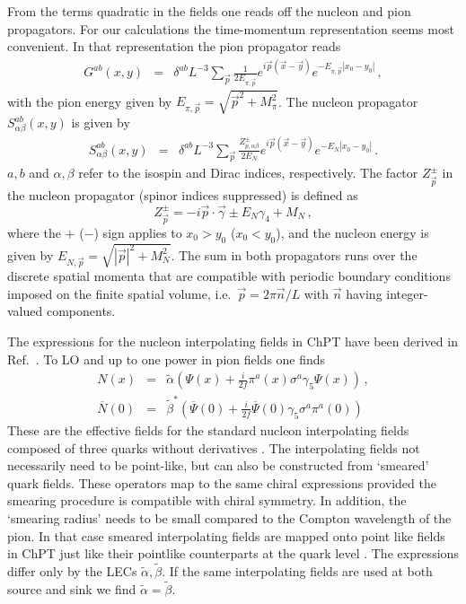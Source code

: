 \documentclass[11pt,prd,aps,showpacs,eqsecnum,floatfix,nofootinbib,preprint,tightenlines]{revtex4}
\newcommand{\Epip}{E_{\pi, \vec{p}}}
\begin{document}
\begin{appendix}
From the terms quadratic in the fields one reads off the nucleon and pion propagators. For our calculations the time-momentum representation seems most convenient. In that representation the pion propagator reads
\begin{eqnarray}
G^{ab}(x,y)& = &  \delta^{ab}L^{-3}\sum_{\vec{p}} \frac{1}{2 \Epip} e^{i\vec{p}(\vec{x}-\vec{y})} e^{-\Epip |x_0 - y_0|}\,,\label{scalprop}
\end{eqnarray}
with  the pion energy given by $\Epip =\sqrt{\vec{p}^2 +M_{\pi}^2}$. The nucleon propagator $S^{ab}_{\alpha\beta}(x,y)$ is given by
\begin{eqnarray}
S_{\alpha\beta}^{ab}(x,y)& = &  \delta^{ab} L^{-3}\sum_{\vec{p}} \frac{Z_{p,\alpha\beta}^{\pm}}{2E_N} e^{i\vec{p}(\vec{x}-\vec{y})} e^{-E_N |x_0 - y_0|}\,.
\end{eqnarray} 
$a,b$ and $\alpha,\beta$ refer to the isospin and Dirac indices, respectively. The factor $Z^{\pm}_{\vec{p}}$ in the nucleon propagator (spinor indices suppressed) is defined as
\begin{equation}
Z_{\vec{p}}^{\pm}=-i\vec{p}\cdot\vec{\gamma} \pm E_N \gamma_4+M_N\,, 
\end{equation}
where the $+$ ($-$) sign applies to $x_0 > y_0$ ($x_0 < y_0$), and the nucleon energy is given by $E_{N,\vec{p}}=\sqrt{|\vec{p}|^2 +M_N^2}$. 
The sum in both propagators runs over the discrete spatial momenta that are compatible with periodic boundary conditions imposed on the finite spatial volume, i.e.\ 
$\vec{p}=2\pi \vec{n}/L$  with $\vec{n}$ having integer-valued components.

The expressions for the nucleon interpolating fields in ChPT have been derived in Ref.\ \cite{Wein:2011ix}. To LO and up to one power in pion fields one finds
\begin{eqnarray}\label{Neffexp}
N(x)& = & \tilde{\alpha} \left(\Psi(x) + \frac{i}{2f} \pi^a(x)\sigma^a \gamma_5\Psi(x)\right)\,,\\
\overline{N}(0) & = & \tilde{\beta}^* \left(\overline{\Psi}(0) + \frac{i}{2f}\overline{\Psi}(0)\gamma_5\sigma^a\pi^a(0) \right)
\end{eqnarray}
These are the effective fields for the standard nucleon interpolating fields composed of three quarks without derivatives \cite{Ioffe:1981kw,Espriu:1983hu}. The interpolating fields not necessarily need to be point-like, but can also be constructed from `smeared' quark fields. These operators map to the same chiral expressions provided the smearing procedure is compatible with chiral symmetry. In addition, the `smearing radius' needs to be small compared to the Compton wavelength of the pion. In that case smeared interpolating fields are mapped onto point like fields in ChPT just like their pointlike counterparts at the quark level  \cite{Bar:2013ora,Bar:2015zwa}. The expressions differ only by the LECs $\tilde{\alpha},\tilde{\beta}$. If the same interpolating fields are used at both source and sink we find $\tilde{\alpha}=\tilde{\beta}$. 


\end{appendix}
\end{document}
